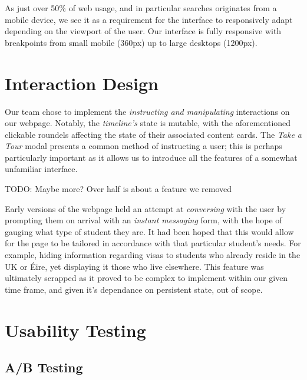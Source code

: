 \documentclass[a4paper, notoc]{tufte-handout}
\begin{document}
As just over 50\% of web usage, and in particular searches originates from a mobile device,
we see it as a requirement for the interface to responsively adapt depending on the 
viewport of the user. Our interface is fully responsive with breakpoints from small
mobile (360px) up to large desktops (1200px).

\section{Interaction Design}\label{label:interaction-design}

Our team chose to implement the \textit{instructing and manipulating} interactions on our 
webpage. Notably, the \textit{timeline's} state is mutable, with the aforementioned
clickable roundels affecting the state of their associated content cards. The \textit{Take a Tour}
modal presents a common method of instructing a user; this is perhaps particularly important
as it allows us to introduce all the features of a somewhat unfamiliar interface.

TODO: Maybe more? Over half is about a feature we removed

Early versions of the webpage held an attempt 
at \textit{conversing} with the user by prompting them on arrival with an \textit{instant 
messaging} form, with the hope of gauging what type of student they are. It had been 
hoped that this would allow for the page to be tailored in accordance with that particular 
student's needs. For example, hiding information regarding visas to students who already 
reside in the UK or Éire, yet displaying it those who live elsewhere. This feature was 
ultimately scrapped as it proved to be complex to implement within our given time frame, and 
given it's dependance on persistent state, out of scope.


\section{Usability Testing}\label{sec:usability-testing}


\subsection{A/B Testing}\label{subsec:a-b-testing}
\end{document}
